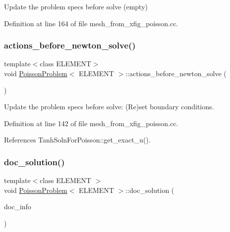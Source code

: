 Update the problem specs before solve (empty) 



Definition at line 164 of file mesh\+\_\+from\+\_\+xfig\+\_\+poisson.\+cc.

\mbox{\label{classPoissonProblem_a398608a5ff73b74c5a387b3f794c58df}} 
\subsubsection{\texorpdfstring{actions\+\_\+before\+\_\+newton\+\_\+solve()}{actions\_before\_newton\_solve()}}
{\footnotesize\ttfamily template$<$class E\+L\+E\+M\+E\+NT$>$ \\
void \hyperlink{classPoissonProblem}{Poisson\+Problem}$<$ E\+L\+E\+M\+E\+NT $>$\+::actions\+\_\+before\+\_\+newton\+\_\+solve (\begin{DoxyParamCaption}{ }\end{DoxyParamCaption})\hspace{0.3cm}{\ttfamily [inline]}}



Update the problem specs before solve\+: (Re)set boundary conditions. 



Definition at line 142 of file mesh\+\_\+from\+\_\+xfig\+\_\+poisson.\+cc.



References Tanh\+Soln\+For\+Poisson\+::get\+\_\+exact\+\_\+u().

\mbox{\label{classPoissonProblem_aab6f503fa242f687bb8452527bb7688f}} 
\subsubsection{\texorpdfstring{doc\+\_\+solution()}{doc\_solution()}}
{\footnotesize\ttfamily template$<$class E\+L\+E\+M\+E\+NT $>$ \\
void \hyperlink{classPoissonProblem}{Poisson\+Problem}$<$ E\+L\+E\+M\+E\+NT $>$\+::doc\+\_\+solution (\begin{DoxyParamCaption}\item[{Doc\+Info \&}]{doc\+\_\+info }\end{DoxyParamCaption})}



